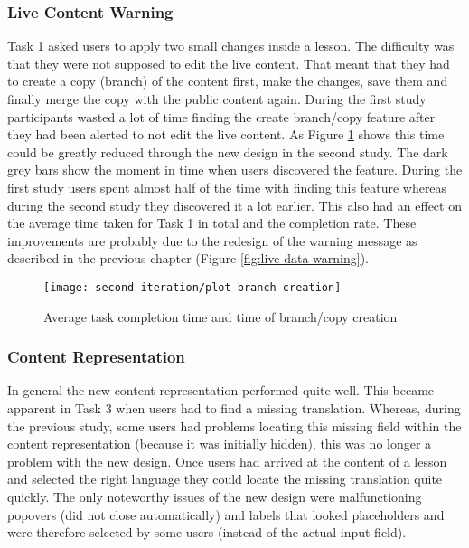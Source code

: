 \subsubsection{Live Content Warning}
Task 1 asked users to apply two small changes inside a lesson. The difficulty was that they were not supposed to edit the live content. That meant that they had to create a copy (branch) of the content first, make the changes, save them and finally merge the copy with the public content again. During the first study participants wasted a lot of time finding the create branch/copy feature after they had been alerted to not edit the live content. As Figure \ref{fig:avg-time-task1} shows this time could be greatly reduced through the new design in the second study. The dark grey bars show the moment in time when users discovered the feature. During the first study users spent almost half of the time with finding this feature whereas during the second study they discovered it a lot earlier. This also had an effect on the average time taken for Task 1 in total and the completion rate. These improvements are probably due to the redesign of the warning message as described in the previous chapter (Figure \ref{fig:live-data-warning}).

\begin{figure}[h!]
 \centering
 \texttt{[image: second-iteration/plot-branch-creation]}
 \caption{Average task completion time and time of branch/copy creation}
 \label{fig:avg-time-task1}
\end{figure}

\subsubsection{Content Representation}
In general the new content representation performed quite well. This became apparent in Task 3 when users had to find a missing translation. Whereas, during the previous study, some users had problems locating this missing field within the content representation (because it was initially hidden), this was no longer a problem with the new design. Once users had arrived at the content of a lesson and selected the right language they could locate the missing translation quite quickly. The only noteworthy issues of the new design were malfunctioning popovers (did not close automatically) and labels that looked placeholders and were therefore selected by some users (instead of the actual input field).



